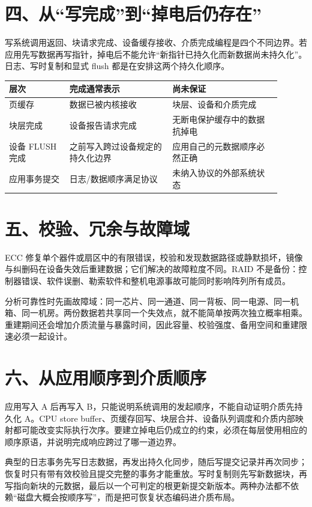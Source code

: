 \section{四、从“写完成”到“掉电后仍存在”}

写系统调用返回、块请求完成、设备缓存接收、介质完成编程是四个不同边界。若应用先写数据再写指针，掉电后不能允许“新指针已持久化而新数据尚未持久化”。日志、写时复制和显式 flush 都是在安排这两个持久化顺序。

\begin{longtable}{L{0.2\linewidth}L{0.34\linewidth}L{0.36\linewidth}}
\toprule
层次 & 完成通常表示 & 尚未保证 \\
\midrule
页缓存 & 数据已被内核接收 & 块层、设备和介质完成 \\\tablerowrule
块层完成 & 设备报告请求完成 & 无断电保护缓存中的数据抗掉电 \\\tablerowrule
设备 FLUSH 完成 & 之前写入跨过设备规定的持久化边界 & 应用自己的元数据顺序必然正确 \\\tablerowrule
应用事务提交 & 日志/数据顺序满足协议 & 未纳入协议的外部系统状态 \\
\bottomrule
\end{longtable}

\section{五、校验、冗余与故障域}

ECC 修复单个器件或扇区中的有限错误，校验和发现数据路径或静默损坏，镜像与纠删码在设备失效后重建数据；它们解决的故障粒度不同。RAID 不是备份：控制器错误、软件误删、勒索软件和整机电源事故可能同时影响阵列所有成员。

分析可靠性时先画故障域：同一芯片、同一通道、同一背板、同一电源、同一机箱、同一机房。两份数据若共享同一个失效点，就不能简单按两次独立概率相乘。重建期间还会增加介质流量与暴露时间，因此容量、校验强度、备用空间和重建限速必须一起设计。

\section{六、从应用顺序到介质顺序}

应用写入 A 后再写入 B，只能说明系统调用的发起顺序，不能自动证明介质先持久化 A。CPU store buffer、页缓存回写、块层合并、设备队列调度和介质内部映射都可能改变实际执行次序。要建立掉电后仍成立的约束，必须在每层使用相应的顺序原语，并说明完成响应跨过了哪一道边界。

典型的日志事务先写日志数据，再发出持久化同步，随后写提交记录并再次同步；恢复时只有带有效校验且提交完整的事务才能重放。写时复制则先写新数据块，再写指向新块的元数据，最后以一个可判定的根更新提交新版本。两种办法都不依赖“磁盘大概会按顺序写”，而是把可恢复状态编码进介质布局。

